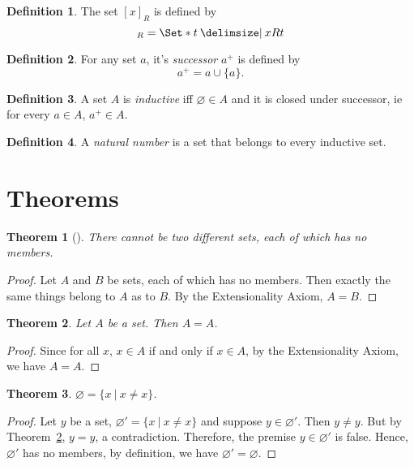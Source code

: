 \documentclass[12pt]{article}
\theoremstyle{plain}
\newtheorem{thm}{Theorem}[section]
\theoremstyle{remark}
\theoremstyle{definition}
\newtheorem{defn}{Definition}[section]
\theoremstyle{remark}
\newcommand{\thmproof}[3]{%
  \begin{thm}[#1]
    #2
  \end{thm}
  \begin{proof}
    #3
  \end{proof}
}
\providecommand\st{}
\newcommand\SetSymbol[1][]{%
  \nonscript\:#1\vert%
  \allowbreak%
  \nonscript\:
\mathopen{}}
\renewcommand\st{\SetSymbol[\delimsize]}
\begin{document}
\begin{defn}
  The set $[x]_R$ is defined by
  \begin{equation*}
    [x]_R = \Set*{t \st xRt}
  \end{equation*}
\end{defn}

\begin{defn}
  For any set $a$, it's \textit{successor} $a^+$ is defined by
  \begin{equation*}
    a^+ = a \cup \{a\}.
  \end{equation*}
\end{defn}

\begin{defn}
  A set $A$ is \textit{inductive} iff $\varnothing \in A$ and it is closed under successor, ie for every $a \in A$, $a^+ \in A$.
\end{defn}

\begin{defn}
  A \textit{natural number} is a set that belongs to every inductive set.
\end{defn}

\section{Theorems}
\thmproof{}{There cannot be two different sets, each of which has no members.}
{Let $A$ and $B$ be sets, each of which has no members. Then exactly the same things belong to $A$ as to $B$. By the Extensionality Axiom, $A = B$.
}

\begin{thm}\label{identity}
  Let $A$ be a set. Then $A = A$.
\end{thm}
\begin{proof}
  Since for all $x$, $x \in A$ if and only if $x \in A$, by the Extensionality Axiom, we have $A = A$.
\end{proof}

\begin{thm}
  $\varnothing = \{x\ |\ x \neq x\}$.
\end{thm}
\begin{proof}
  Let $y$ be a set, $\varnothing' = \{x\ |\ x \neq x\}$ and suppose $y \in \varnothing'$. Then $y \neq y$. But by Theorem~\ref{identity}, $y = y$, a contradiction. Therefore, the premise $y \in \varnothing'$ is false. Hence, $\varnothing'$ has no members, by definition, we have $\varnothing' = \varnothing$.
\end{proof}
\end{document}
